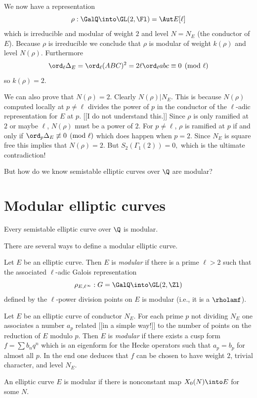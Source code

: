 \documentclass{report}
\begin{document}
We now have a representation
$$\rho:\GalQ\into\GL(2,\Fl)=\Aut E[\ell]$$
which is irreducible and modular of weight
$2$ and level $N=N_E$ (the conductor of $E$).
Because $\rho$ is irreducible we conclude that
$\rho$ is modular of weight $k(\rho)$ and level
$N(\rho)$.
Furthermore
$$\ord_{\ell}\Delta_E=\ord_{\ell}(ABC)^2
          =2\ell\ord_{\ell}abc\equiv 0\pmod{\ell}$$
so $k(\rho)=2$.

We can also prove that $N(\rho)=2$. Clearly
$N(\rho)|N_E$. This is because $N(\rho)$ computed locally
at $p\neq\ell$ divides the power of $p$ in the conductor
of the $\ell$-adic representation for $E$ at $p$. [[I do not
understand this.]] Since $\rho$ is only ramified at $2$ or maybe $\ell$,
$N(\rho)$ must be a power of $2$. For $p\neq \ell$, $\rho$ is ramified
at $p$ if and only if $\ord_p\Delta_E\not\equiv 0\pmod{\ell}$ which
does happen when $p=2$.
Since $N_E$ is square free this implies that $N(\rho)=2$.
But $S_2(\Gamma_1(2))=0,$
which is the ultimate contradiction!

But how do we know semistable elliptic curves over $\Q$ are modular?


\section{Modular elliptic curves}

\begin{theorem}[Theorem A] Every semistable elliptic curve over
$\Q$ is modular. \end{theorem}

There are several ways to define a modular elliptic curve.
\begin{defn} Let $E$ be an elliptic curve. Then $E$ is {\em modular}
if there is a prime $\ell>2$ such that the associated
$\ell$-adic Galois representation
$$\rho_{E,\ell^{\infty}}:G=\GalQ\into\GL(2,\Zl)$$
defined by the $\ell$-power division points on $E$ is
modular (i.e., it is a $\rholamf$).
\end{defn}
\begin{defn}
Let $E$ be an elliptic curve of conductor $N_E$. For each
prime $p$ not dividing $N_E$ one associates a number $a_p$
related [[in a simple way!]] to the number of points on
the reduction of $E$ modulo $p$. Then $E$ is {\em modular}
if there exists a cusp form $f=\sum b_n q^n$ which is an eigenform
for the Hecke operators such that $a_p=b_p$ for almost all $p$.
In the end one deduces that $f$ can be chosen to have weight $2$,
trivial character, and level $N_E$.
\end{defn}
\begin{defn}[Shimura]
An elliptic curve $E$ is modular if there is nonconstant
map $X_0(N)\into E$ for some $N$.
\end{defn}
\end{document}
